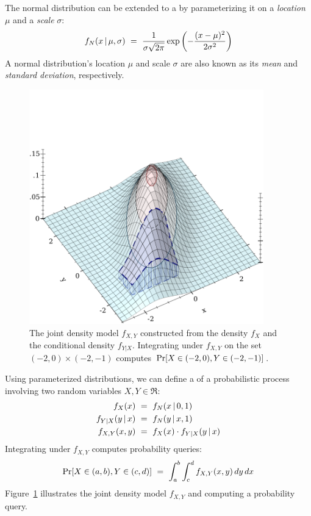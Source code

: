 The normal distribution can be extended to a  by parameterizing it on a \emph{location} $\mu$ and a \emph{scale} $\sigma$:
\begin{equation}
	f_N(x \given \mu,\sigma)\ =\ \frac{1}{\sigma\sqrt{2\pi}} \exp\left(-\frac{(x-\mu)^2}{2\sigma^2}\right)
\end{equation}
A normal distribution's location $\mu$ and scale $\sigma$ are also known as its \emph{mean} and \emph{standard deviation}, respectively.

\begin{figure}[tb]\centering
\includegraphics[width=4in]{2d-density-integrate}
\caption[Joint density model plot]{The joint density model $f_{X,Y}$ constructed from the density $f_X$ and the conditional density $f_{Y|X}$. Integrating under $f_{X,Y}$ on the set $(-2,0) \times (-2,-1)$ computes $\mathrm{Pr}\!\left[{X \in (-2,0), Y \in (-2,-1)}\right]$.}
\label{fig:joint-density-model}
\end{figure}

Using parameterized distributions, we can define a  of a probabilistic process involving two random variables $X,Y \in \Re$:
\begin{equation}
\begin{aligned}
	f_X(x)&\ =\ f_N(x \,|\, 0,1) \\
	f_{Y|X}(y \,|\, x)&\ =\ f_N(y \,|\, x,1) \\
	f_{X,Y}(x,y)&\ =\ f_X(x) \cdot f_{Y|X}(y \,|\, x)
\end{aligned}
\end{equation}
Integrating under $f_{X,Y}$ computes probability queries:
\begin{equation}
	\mathrm{Pr}\!\left[{X \in (a,b), Y \in (c,d)}\right]\ =\ \int_a^b \int_c^d f_{X,Y}(x,y)\,dy\,dx
\end{equation}
Figure~\ref{fig:joint-density-model} illustrates the joint density model $f_{X,Y}$ and computing a probability query.

